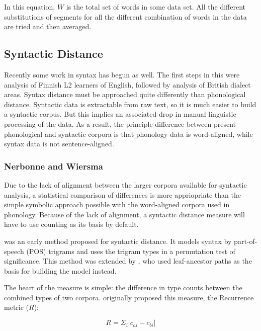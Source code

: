 \documentclass[11pt]{article}
\begin{document}
In this equation, $W$ is the total set of words in some data set. All
the different substitutions of segments for all the different
combination of words in the data are tried and then averaged.

\subsection{Syntactic  Distance}
Recently some work in syntax has begun as well. The first steps in
this were  analysis of Finnish L2 learners
of English, followed by  analysis of British dialect
areas. Syntax distance must be approached quite differently than
phonological distance. Syntactic data is extractable from raw
text, so it is much easier to build a syntactic corpus. But this implies an
associated drop in manual linguistic processing of the
data. As a result, the principle difference between present phonological and
syntactic corpora is that phonology data is word-aligned, while syntax
data is not sentence-aligned.

\subsubsection{Nerbonne and Wiersma}
\label{nerbonne06}

Due to the lack of alignment between the
larger corpora available for syntactic analysis, a statistical
comparison of differences is more appriopriate than the simple
symbolic approach possible with the word-aligned corpora used in
phonology. Because of the lack of alignment, a syntactic distance
measure will have to use counting as its basis by default.

 was an early method proposed for syntactic
distance.  It models syntax by part-of-speech (POS) trigrams and uses
the trigram types in a permutation test of significance. This method was
extended by , who used 
leaf-ancestor paths as the basis for building the model instead.

The heart of the measure is simple: the difference in type counts
between the combined types of two corpora. 
originally proposed this measure, the {\sc Recurrence}
metric ($R$):

\begin{equation}
R = \Sigma_i |c_{ai} - c_{bi}|
\label{rmeasure}
\end{equation}
\end{document}
